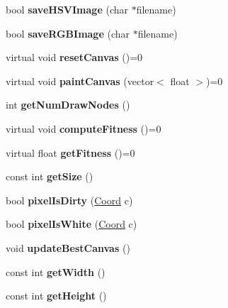 \begin{DoxyCompactItemize}
\item 
\hypertarget{class_canvas_a20a5bfc766b35f031f87602a33d004b1}{bool {\bfseries save\-H\-S\-V\-Image} (char $\ast$filename)}\label{class_canvas_a20a5bfc766b35f031f87602a33d004b1}

\item 
\hypertarget{class_canvas_a0cd8a0f0e6a1b8bae854d93277926951}{bool {\bfseries save\-R\-G\-B\-Image} (char $\ast$filename)}\label{class_canvas_a0cd8a0f0e6a1b8bae854d93277926951}

\item 
\hypertarget{class_canvas_abd119da0a1dc1b24a45c8c45bd398732}{virtual void {\bfseries reset\-Canvas} ()=0}\label{class_canvas_abd119da0a1dc1b24a45c8c45bd398732}

\item 
\hypertarget{class_canvas_aa5c92419e72221fd67fae506419ec165}{virtual void {\bfseries paint\-Canvas} (vector$<$ float $>$)=0}\label{class_canvas_aa5c92419e72221fd67fae506419ec165}

\item 
\hypertarget{class_canvas_a23c0eb700982cfb7e8f468b51aa7adde}{int {\bfseries get\-Num\-Draw\-Nodes} ()}\label{class_canvas_a23c0eb700982cfb7e8f468b51aa7adde}

\item 
\hypertarget{class_canvas_a9a96d277519345b76e27349ca8d6421d}{virtual void {\bfseries compute\-Fitness} ()=0}\label{class_canvas_a9a96d277519345b76e27349ca8d6421d}

\item 
\hypertarget{class_canvas_a21fb2ed04cb521a5cdb3516bfa7bf6f1}{virtual float {\bfseries get\-Fitness} ()=0}\label{class_canvas_a21fb2ed04cb521a5cdb3516bfa7bf6f1}

\item 
\hypertarget{class_canvas_af78dc240a3278b5d7abad1cd743e31c4}{const int {\bfseries get\-Size} ()}\label{class_canvas_af78dc240a3278b5d7abad1cd743e31c4}

\item 
\hypertarget{class_canvas_a32c661c9bf432d32b6b75d097cba614f}{bool {\bfseries pixel\-Is\-Dirty} (\hyperlink{struct_coord}{Coord} c)}\label{class_canvas_a32c661c9bf432d32b6b75d097cba614f}

\item 
\hypertarget{class_canvas_aff7ccbf887a62cfaf2785845d5dabb17}{bool {\bfseries pixel\-Is\-White} (\hyperlink{struct_coord}{Coord} c)}\label{class_canvas_aff7ccbf887a62cfaf2785845d5dabb17}

\item 
\hypertarget{class_canvas_ac2032301cc13268992ecf3df85b73de0}{void {\bfseries update\-Best\-Canvas} ()}\label{class_canvas_ac2032301cc13268992ecf3df85b73de0}

\item 
\hypertarget{class_canvas_a36f33f02cee811e0d5a13e659eeb1f73}{const int {\bfseries get\-Width} ()}\label{class_canvas_a36f33f02cee811e0d5a13e659eeb1f73}

\item 
\hypertarget{class_canvas_a0b94a41db3014f125219155940437505}{const int {\bfseries get\-Height} ()}\label{class_canvas_a0b94a41db3014f125219155940437505}

\end{DoxyCompactItemize}

